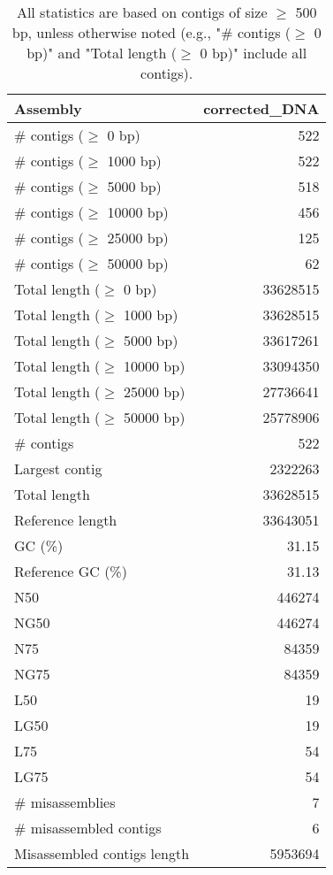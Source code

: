 \documentclass[12pt,a4paper]{article}
\begin{document}
\begin{table}[ht]
\begin{center}
\caption{All statistics are based on contigs of size $\geq$ 500 bp, unless otherwise noted (e.g., "\# contigs ($\geq$ 0 bp)" and "Total length ($\geq$ 0 bp)" include all contigs).}
\begin{tabular}{|l*{1}{|r}|}
\hline
Assembly & corrected\_DNA \\ \hline
\# contigs ($\geq$ 0 bp) & 522 \\ \hline
\# contigs ($\geq$ 1000 bp) & 522 \\ \hline
\# contigs ($\geq$ 5000 bp) & 518 \\ \hline
\# contigs ($\geq$ 10000 bp) & 456 \\ \hline
\# contigs ($\geq$ 25000 bp) & 125 \\ \hline
\# contigs ($\geq$ 50000 bp) & 62 \\ \hline
Total length ($\geq$ 0 bp) & 33628515 \\ \hline
Total length ($\geq$ 1000 bp) & 33628515 \\ \hline
Total length ($\geq$ 5000 bp) & 33617261 \\ \hline
Total length ($\geq$ 10000 bp) & 33094350 \\ \hline
Total length ($\geq$ 25000 bp) & 27736641 \\ \hline
Total length ($\geq$ 50000 bp) & 25778906 \\ \hline
\# contigs & 522 \\ \hline
Largest contig & 2322263 \\ \hline
Total length & 33628515 \\ \hline
Reference length & 33643051 \\ \hline
GC (\%) & 31.15 \\ \hline
Reference GC (\%) & 31.13 \\ \hline
N50 & 446274 \\ \hline
NG50 & 446274 \\ \hline
N75 & 84359 \\ \hline
NG75 & 84359 \\ \hline
L50 & 19 \\ \hline
LG50 & 19 \\ \hline
L75 & 54 \\ \hline
LG75 & 54 \\ \hline
\# misassemblies & 7 \\ \hline
\# misassembled contigs & 6 \\ \hline
Misassembled contigs length & 5953694 \\ \hline

\end{tabular}
\end{center}
\end{table}
\end{document}
